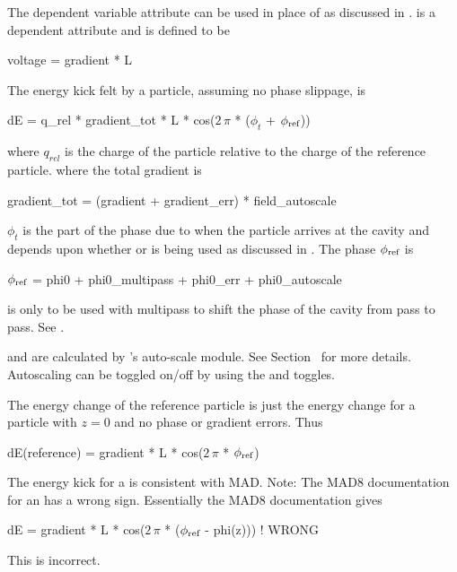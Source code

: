 The dependent variable  attribute can be used in place of  as discussed in
.   is a dependent attribute and is defined to be
\begin{example}
  voltage = gradient * L
\end{example}

The energy kick felt by a particle, assuming no phase slippage, is 
\begin{example}
  dE = q_{rel} * gradient_tot * L * cos(\(2\,\pi\) * (\(\phi_t\) + \(\phi_{\text{ref}}\)))
\end{example}
where $q_{rel}$ is the charge of the particle relative to the charge of the reference particle.
where the total gradient is
\begin{example}
  gradient_tot = (gradient + gradient_err) * field_autoscale
\end{example}
$\phi_t$ is the part of the phase due to when the particle arrives at the cavity and depends upon
whether  or  is being used as discussed in
.  The phase $\phi_{\text{ref}}$ is
\begin{example}
  \(\phi_{\text{ref}}\) = phi0 + phi0_multipass + phi0_err + phi0_autoscale
  \label{lcav.phi}
\end{example}

 is only to be used with multipass to shift the phase of the cavity from pass to
pass. See .

 and  are calculated by \bmad's auto-scale module. See
Section~ for more details. Autoscaling can be toggled on/off by using the
 and  toggles.

The energy change of the reference particle is just the energy change for a 
particle with $z = 0$ and no phase or gradient errors. Thus
\begin{example}
  dE(reference) = gradient * L * cos(\(2\,\pi\) * \(\phi_{\text{ref}}\))
\end{example}

The energy kick for a \bmad {} is consistent with MAD. 
Note: The MAD8 documentation for an  has a wrong
sign. Essentially the MAD8 documentation gives
\begin{example}
  dE = gradient * L * cos(\(2\,\pi\) * (\(\phi_{\text{ref}}\) - phi(z))) ! WRONG
\end{example}
This is incorrect. 

